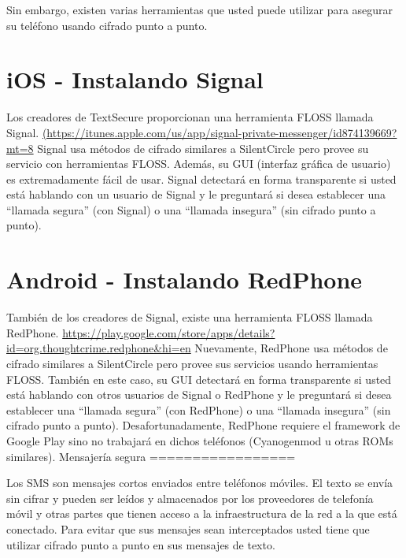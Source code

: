 \documentclass[10pt,a5paper,twoside,,]{book}
\begin{document}
Sin embargo, existen varias herramientas que usted puede utilizar para
asegurar su teléfono usando cifrado punto a punto.

\section{iOS - Instalando Signal}\label{ios---instalando-signal}

Los creadores de TextSecure proporcionan una herramienta FLOSS llamada
Signal.
\href{https://itunes,apple.com/us/app/signal-private-messenger/id874139669?mt=8}{(https://itunes.apple.com/us/app/signal-private-messenger/id874139669?mt=8}
Signal usa métodos de cifrado similares a SilentCircle pero provee su
servicio con herramientas FLOSS. Además, su GUI (interfaz gráfica de
usuario) es extremadamente fácil de usar. Signal detectará en forma
transparente si usted está hablando con un usuario de Signal y le
preguntará si desea establecer una ``llamada segura'' (con Signal) o una
``llamada insegura'' (sin cifrado punto a punto).

\section{Android - Instalando
RedPhone}\label{android---instalando-redphone}

También de los creadores de Signal, existe una herramienta FLOSS llamada
RedPhone.
\href{https://play.google.com/store/apps/details?id=org.thoughtcrime.redphone\&hl=en}{https://play.google.com/store/apps/details?id=org.thoughtcrime.redphone\&hi=en}
Nuevamente, RedPhone usa métodos de cifrado similares a SilentCircle
pero provee sus servicios usando herramientas FLOSS. También en este
caso, su GUI detectará en forma transparente si usted está hablando con
otros usuarios de Signal o RedPhone y le preguntará si desea establecer
una ``llamada segura'' (con RedPhone) o una ``llamada insegura'' (sin
cifrado punto a punto). Desafortunadamente, RedPhone requiere el
framework de Google Play sino no trabajará en dichos teléfonos
(Cyanogenmod u otras ROMs similares). Mensajería segura
=================

Los SMS son mensajes cortos enviados entre teléfonos móviles. El texto
se envía sin cifrar y pueden ser leídos y almacenados por los
proveedores de telefonía móvil y otras partes que tienen acceso a la
infraestructura de la red a la que está conectado. Para evitar que sus
mensajes sean interceptados usted tiene que utilizar cifrado punto a
punto en sus mensajes de texto.
\end{document}
